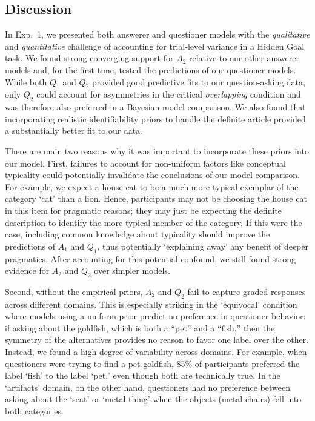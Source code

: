 \documentclass[11pt, floatsintext]{apa6}
\begin{document}
\subsection{Discussion}

In Exp.~1, we presented both answerer and questioner models with the  \emph{qualitative} and \emph{quantitative} challenge of accounting for trial-level variance in a Hidden Goal task. 
We found strong converging support for $A_2$ relative to our other answerer models and, for the first time, tested the predictions of our questioner models. 
While both $Q_1$ and $Q_2$ provided good predictive fits to our question-asking data, only $Q_2$ could account for asymmetries in the critical \emph{overlapping} condition and was therefore also preferred in a Bayesian model comparison. 
We also found that incorporating realistic identifiability priors to handle the definite article provided a substantially better fit to our data. 

There are main two reasons why it was important to incorporate these priors into our model.
First, failures to account for non-uniform factors like conceptual typicality could potentially invalidate the conclusions of our model comparison. 
For example, we expect a house cat to be a much more typical exemplar of the category `cat' than a lion. 
Hence, participants may not be choosing the house cat in this item for pragmatic reasons; they may just be expecting the definite description to identify the more typical member of the category. 
If this were the case, including common knowledge about typicality should improve the predictions of $A_1$ and $Q_1$, thus potentially `explaining away' any benefit of deeper pragmatics. 
After accounting for this potential confound, we still found strong evidence for $A_2$ and $Q_2$ over simpler models.

Second, without the empirical priors, $A_2$ and $Q_2$ fail to capture graded responses across different domains. 
This is especially striking in the `equivocal' condition where models using a uniform prior predict no preference in questioner behavior: if asking about the goldfish, which is both a ``pet'' and a ``fish,'' then the symmetry of the alternatives provides no reason to favor one label over the other. 
Instead, we found a high degree of variability across domains. 
For example, when questioners were trying to find a pet goldfish, 85\% of participants preferred the label `fish' to the label `pet,' even though both are technically true. 
In the `artifacts' domain, on the other hand, questioners had no preference between asking about the `seat' or `metal thing' when the objects (metal chairs) fell into both categories.
\end{document}
